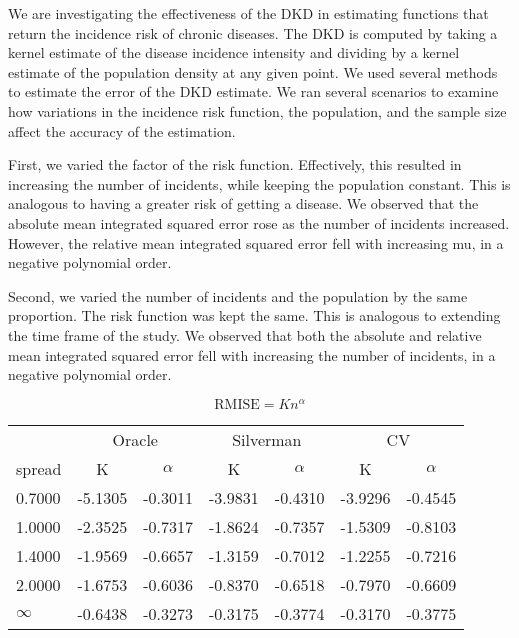 

We are investigating the effectiveness of the DKD in estimating functions that return the incidence risk of chronic diseases. 
The DKD is computed by taking a kernel estimate of the disease incidence intensity and dividing by a kernel estimate of the population density at any given point.
We used several methods to estimate the error of the DKD estimate.
We ran several scenarios to examine how variations in the incidence risk function, the population, and the sample size affect the accuracy of the estimation. 

First, we varied the \gls{factor} of the risk function.
Effectively, this resulted in increasing the number of incidents, while keeping the population constant.
This is analogous to having a greater risk of getting a disease.
We observed that the absolute mean integrated squared error rose as the number of incidents increased.
However, the relative mean integrated squared error fell with increasing \gls{mu}, in a negative polynomial order.

Second, we varied the number of incidents and the population by the same proportion.
The risk function was kept the same.
This is analogous to extending the time frame of the study.
We observed that both the absolute and relative mean integrated squared error fell with increasing the number of incidents, in a negative polynomial order.

\[
    \mbox{RMISE} = K n^{\alpha}
\]


\begin{table}[htbp]
\begin{tabular}{l*6c}
  \hline
  & \multicolumn{2}{c}{Oracle} & \multicolumn{2}{c}{Silverman} & \multicolumn{2}{c}{CV} \\ 
  \gls{spread} & K & \( \alpha \) & K & \( \alpha \) & K & \( \alpha \) \\ 
  \hline
  0.7000 & -5.1305 & -0.3011 & -3.9831 & -0.4310 & -3.9296 & -0.4545 \\ 
  1.0000 & -2.3525 & -0.7317 & -1.8624 & -0.7357 & -1.5309 & -0.8103 \\ 
  1.4000 & -1.9569 & -0.6657 & -1.3159 & -0.7012 & -1.2255 & -0.7216 \\ 
  2.0000 & -1.6753 & -0.6036 & -0.8370 & -0.6518 & -0.7970 & -0.6609 \\ 
  \( \infty \) & -0.6438 & -0.3273 & -0.3175 & -0.3774 & -0.3170 & -0.3775 \\ 
  \hline
\end{tabular}
\end{table}

